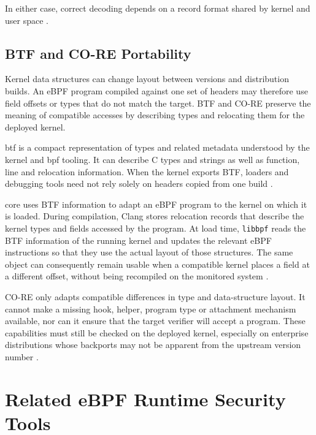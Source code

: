 In either case, correct decoding depends on a record format shared by kernel
and user space
\cite{gbadamosi2024ebpf}.

\subsection{BTF and CO-RE Portability}
\label{subsec:ebpf-btf-core}

Kernel data structures can change layout between versions and distribution
builds. An eBPF program compiled against one set of headers may therefore use
field offsets or types that do not match the target. BTF and CO-RE preserve the
meaning of compatible accesses by describing types and relocating them for the
deployed kernel.

\gls{btf} is a compact representation of types and related metadata understood
by the kernel and \gls{bpf} tooling. It can describe C types and strings as well
as function, line and relocation information. When the kernel exports BTF,
loaders and debugging tools need not rely solely on headers copied from one
build
\cite{linux_btf}.

\gls{core} uses BTF information to adapt an eBPF program to the kernel on
which it is loaded. During compilation, Clang stores relocation records that
describe the kernel types and fields accessed by the program. At load time,
\texttt{libbpf} reads the BTF information of the running kernel and updates the
relevant eBPF instructions so that they use the actual layout of those
structures. The same object can consequently remain usable when a compatible
kernel places a field at a different offset, without being recompiled on the
monitored system
\cite{linux_btf,linux_bpf_llvm_relocations,linux_libbpf_overview}.

CO-RE only adapts compatible differences in type and data-structure layout. It
cannot make a missing hook, helper, program type or attachment mechanism
available, nor can it ensure that the target verifier will accept a program.
These capabilities must still be checked on the deployed kernel, especially on
enterprise distributions whose backports may not be apparent from the upstream
version number
\cite{linux_bpf_design_qa,redhat2025backporting}.

\section{Related eBPF Runtime Security Tools}
\label{sec:related-runtime-security-tools}

